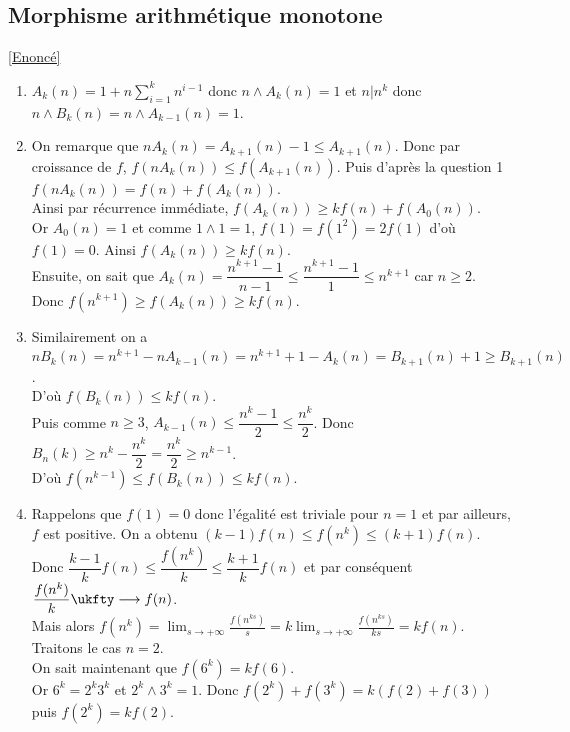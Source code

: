 \documentclass[8pt]{book}
\begin{document}
	\subsection{Morphisme arithmétique monotone }
	\label{Morphisme arithmétique monotone corrigé}
	\textcolor{blue}{\hyperref[Morphisme arithmétique monotone]{[Enoncé]}}\\
	\begin{enumerate}[leftmargin=*]
		\item $A_k(n)=1+n\displaystyle\sum_{i=1}^kn^{i-1}$ donc $n\wedge A_k(n)=1$ et $n|n^k$ donc $n\wedge B_k(n)=n\wedge A_{k-1}(n)=1$.
		\item On remarque que $nA_k(n)=A_{k+1}(n)-1\leq A_{k+1}(n)$. Donc par croissance de $f$, $f(nA_k(n))\leq f(A_{k+1}(n))$. Puis d'après la question 1 $f(nA_k(n))=f(n)+f(A_k(n))$.\\
		Ainsi par récurrence immédiate, $f(A_k(n))\geq kf(n)+f(A_0(n))$.\\
		Or $A_0(n)=1$ et comme $1\wedge 1=1$, $f(1)=f(1^2)=2f(1)$ d'où $f(1)=0$. Ainsi $f(A_k(n))\geq kf(n)$.\\
		Ensuite, on sait que $A_k(n)=\dfrac{n^{k+1}-1}{n-1}\leq \dfrac{n^{k+1}-1}{1}\leq n^{k+1}$ car $n\geq 2$.\\
		Donc $f(n^{k+1})\geq f(A_k(n))\geq kf(n)$.
		\item Similairement on a $nB_k(n)=n^{k+1}-nA_{k-1}(n)=n^{k+1}+1-A_k(n)=B_{k+1}(n)+1\geq B_{k+1}(n)$.\\
		D'où $f(B_k(n))\leq kf(n)$.\\
		Puis comme $n\geq 3$, $A_{k-1}(n)\leq \dfrac{n^k-1}{2}\leq \dfrac{n^k}{2}$. Donc $B_n(k)\geq n^k-\dfrac{n^k}{2}=\dfrac{n^k}{2}\geq n^{k-1}$.\\
		D'où $f(n^{k-1})\leq f(B_k(n))\leq kf(n)$.
		\item Rappelons que $f(1)=0$ donc l'égalité est triviale pour $n=1$ et par ailleurs, $f$ est positive. On a obtenu $(k-1)f(n)\leq f(n^k)\leq (k+1)f(n)$. Donc $\dfrac{k-1}{k}f(n)\leq \dfrac{f(n^k)}{k}\leq \dfrac{k+1}{k}f(n)$ et par conséquent $\dfrac{f(n^k)}{k}\ukfty\longrightarrow f(n)$.\\
		Mais alors $f(n^k)=\displaystyle\lim_{s\to +\infty}\frac{f(n^{ks})}{s}=k\lim_{s\to +\infty}\frac{f(n^{ks})}{ks}=kf(n)$.\\
		Traitons le cas $n=2$.\\
		On sait maintenant que $f(6^k)=kf(6)$.\\
		Or $6^k=2^k3^k$ et $2^k\wedge 3^k=1$. Donc $f(2^k)+f(3^k)=k(f(2)+f(3))$ puis $f(2^k)=kf(2)$.

\end{enumerate}
\end{document}
